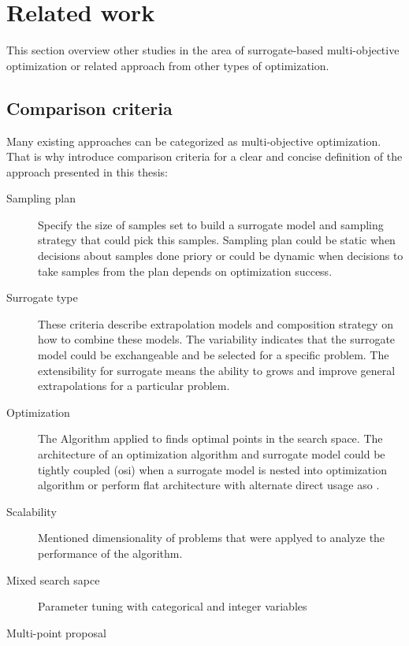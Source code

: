 \chapter{Related work}\label{sec:related}

    This section overview other studies in the area of surrogate-based multi-objective optimization or related approach from other types of optimization.


    \section{Comparison criteria}
        Many existing approaches can be categorized as multi-objective optimization. That is why introduce comparison criteria for a clear and concise definition of the approach presented in this thesis:
        \begin{description}
            \item[Sampling plan] Specify the size of samples set to build a surrogate model and sampling strategy that could pick this samples. Sampling plan could be static when decisions about samples done priory or could be dynamic when decisions to take samples from the plan depends on optimization success.
            \item[Surrogate type] These criteria describe extrapolation models and composition strategy on how to combine these models. The variability indicates that the surrogate model could be exchangeable and be selected for a specific problem. The extensibility for surrogate means the ability to grows and improve general extrapolations for a particular problem.
            \item[Optimization] The Algorithm applied to finds optimal points in the search space. The architecture of an optimization algorithm and surrogate model could be tightly coupled (\gls{osi}) when a surrogate model is nested into optimization algorithm or perform flat architecture with alternate direct usage \gls{aso} \cite{FigueiraA14}.
            \item[Scalability] Mentioned dimensionality of problems that were applyed to analyze the performance of the algorithm.
            \item[Mixed search sapce] Parameter tuning with categorical and integer variables
            \item[Multi-point proposal]  
        \end{description}

